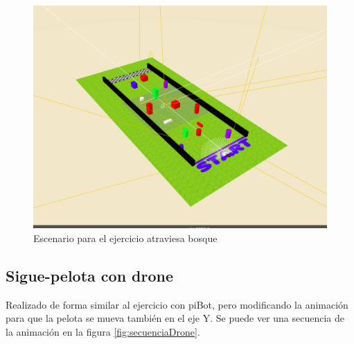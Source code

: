     \begin{figure}[H]
    \centering
    \includegraphics[scale=0.4]{img/atraviesabosque-indiv.png}
    \caption{Escenario para el ejercicio atraviesa bosque} 
    \label{fig:atraviesaBosqueind}
    \end{figure}
    
\subsection{Sigue-pelota con drone}
\label{subsec:pelotadrone}

Realizado de forma similar al ejercicio con piBot, pero modificando la animación para que la pelota se mueva también en el eje Y. Se puede ver una secuencia de la animación en la figura \ref{fig:secuenciaDrone}.


